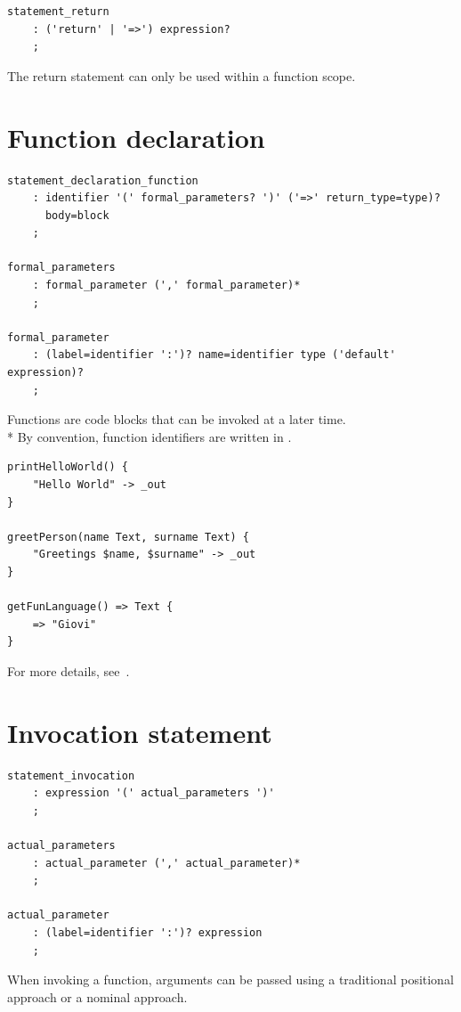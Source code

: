 \begin{verbatim}
statement_return
	: ('return' | '=>') expression?
	;
\end{verbatim}

The return statement can only be used within a function scope.

\clearpage

\section{Function declaration}

\begin{verbatim}
statement_declaration_function
	: identifier '(' formal_parameters? ')' ('=>' return_type=type)?
	  body=block
	;

formal_parameters
	: formal_parameter (',' formal_parameter)*
	;

formal_parameter
	: (label=identifier ':')? name=identifier type ('default' expression)?
	;
\end{verbatim}

Functions are code blocks that can be invoked at a later time.\\*
By convention, function identifiers are written in .

\begin{verbatim}
printHelloWorld() {
	"Hello World" -> _out
}

greetPerson(name Text, surname Text) {
	"Greetings $name, $surname" -> _out
}

getFunLanguage() => Text {
	=> "Giovi"
}
\end{verbatim}

For more details, see~.

\section{Invocation statement}

\begin{verbatim}
statement_invocation
	: expression '(' actual_parameters ')'
	;

actual_parameters
	: actual_parameter (',' actual_parameter)*
	;

actual_parameter
	: (label=identifier ':')? expression
	;
\end{verbatim}

When invoking a function, arguments can be passed using a traditional
positional approach or a nominal approach\footnotemark[1].

